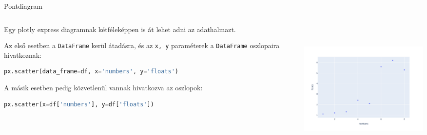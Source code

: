 \documentclass[english, aspectratio=169]{beamer}
\begin{document}
\begin{frame}[fragile]{Pontdiagram}
	\begin{columns}
		\begin{column}{.5\textwidth}
			Egy plotly express diagramnak kétféleképpen is át lehet adni az adathalmazt.\par\medskip
			Az első esetben a \texttt{DataFrame} kerül átadásra, és az \texttt{x, y} paraméterek a \texttt{DataFrame} oszlopaira hivatkoznak:
			\begin{lstlisting}[language=python]
px.scatter(data_frame=df, x='numbers', y='floats')
			\end{lstlisting}
			A másik esetben pedig közvetlenül vannak hivatkozva az oszlopok:
			\begin{lstlisting}[language=python]
px.scatter(x=df['numbers'], y=df['floats'])
			\end{lstlisting}
		\end{column}
		\begin{column}{.5\textwidth}
			\includegraphics[width=7cm, height=7cm, keepaspectratio]{images/plots_8.png}
		\end{column}
	\end{columns}
\end{frame}
\end{document}

